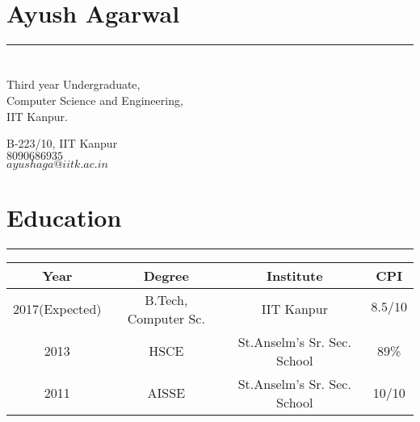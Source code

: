 \documentclass[a4paper]{article}
\author{Ayush Agarwal}
\begin{document}
\section*{\huge\textbf Ayush Agarwal}
\hrule
\section*{}
\begin{minipage}{.45\linewidth}
\begin{flushleft}
 Third year Undergraduate,\\
 Computer Science and Engineering,\\
 IIT Kanpur.
 \end{flushleft}
 \end{minipage}
 \hfill
 \begin{minipage}{.45\linewidth}
 \begin{flushright}
 B-223/10, IIT Kanpur\\
 $8090686935$\\
 $ayushaga@iitk.ac.in$\\
 \end{flushright}
 \end{minipage}
 \section*{Education}
 \hrule
 \begin{center}
 \vspace{3mm}
  \begin{tabular}{|c|c|c|c|}
  \hline
  Year & Degree & Institute & CPI\\
  \hline
  2017(Expected)& B.Tech, Computer Sc.&IIT Kanpur&$8.5/10$\\
  \hline
  2013& HSCE&St.Anselm's Sr. Sec. School&89\% \\
  \hline
  2011& AISSE&St.Anselm's Sr. Sec. School&10/10 \\
  \hline
  \end{tabular}
 \end{center} 
  
\end{document}
